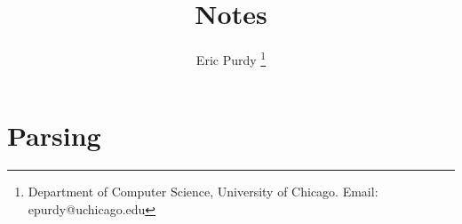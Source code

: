 \documentclass{article}
\title{Notes}
\author{Eric Purdy \footnote{Department of Computer Science, University of Chicago. Email: epurdy@uchicago.edu}}
\begin{document}
\maketitle

\section{Parsing}

\end{document}
